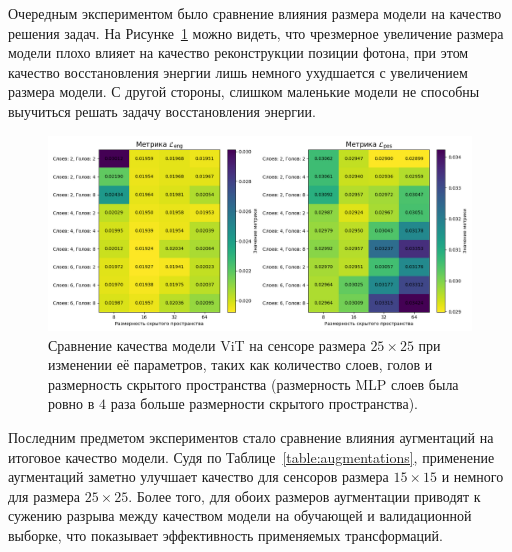 \documentclass[a4paper,12pt]{extarticle}
\begin{document}
Очередным экспериментом было сравнение влияния размера модели на качество решения задач. На Рисунке~\ref{graph:model_params} можно видеть, что чрезмерное увеличение размера модели плохо влияет на качество реконструкции позиции фотона, при этом качество восстановления энергии лишь немного ухудшается с увеличением размера модели. С другой стороны, слишком маленькие модели не способны выучиться решать задачу восстановления энергии.

\begin{figure}[t]
    \centering
    \includegraphics[width=1.0\textwidth]{graphics/exp4_model_params.png}
    \caption{Сравнение качества модели \textsf{ViT} на сенсоре размера $25 \times 25$ при изменении её параметров, таких как количество слоев, голов и размерность скрытого пространства (размерность MLP слоев была ровно в $4$ раза больше размерности скрытого пространства).}
    \label{graph:model_params}
\end{figure}

Последним предметом экспериментов стало сравнение влияния аугментаций на итоговое качество модели. Судя по Таблице~\ref{table:augmentations}, применение аугментаций заметно улучшает качество для сенсоров размера $15 \times 15$ и немного для размера $25 \times 25$. Более того, для обоих размеров аугментации приводят к сужению разрыва между качеством модели на обучающей и валидационной выборке, что показывает эффективность применяемых трансформаций.
\end{document}
